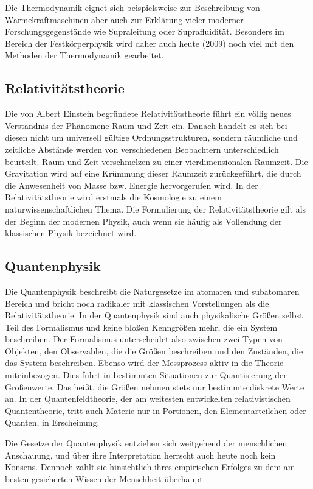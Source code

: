 \documentclass[titlepage, parkskip=full, twocolumn, landscape]{scrartcl}
\begin{document}
Die Thermodynamik eignet sich beispielsweise zur Beschreibung von Wärmekraftmaschinen aber auch zur Erklärung vieler moderner Forschungsgegenstände wie Supraleitung oder Suprafluidität. Besonders im Bereich der Festkörperphysik wird daher auch heute (2009) noch viel mit den Methoden der Thermodynamik gearbeitet.

\subsection{Relativitätstheorie}

Die von Albert Einstein begründete Relativitätstheorie führt ein völlig neues Verständnis der Phänomene Raum und Zeit ein. Danach handelt es sich bei diesen nicht um universell gültige Ordnungsstrukturen, sondern räumliche und zeitliche Abstände werden von verschiedenen Beobachtern unterschiedlich beurteilt. Raum und Zeit verschmelzen zu einer vierdimensionalen Raumzeit. Die Gravitation wird auf eine Krümmung dieser Raumzeit zurückgeführt, die durch die Anwesenheit von Masse bzw. Energie hervorgerufen wird. In der Relativitätstheorie wird erstmals die Kosmologie zu einem naturwissenschaftlichen Thema. Die Formulierung der Relativitätstheorie gilt als der Beginn der modernen Physik, auch wenn sie häufig als Vollendung der klassischen Physik bezeichnet wird.

\subsection{Quantenphysik}

Die Quantenphysik beschreibt die Naturgesetze im atomaren und subatomaren Bereich und bricht noch radikaler mit klassischen Vorstellungen als die Relativitätstheorie. In der Quantenphysik sind auch physikalische Größen selbst Teil des Formalismus und keine bloßen Kenngrößen mehr, die ein System beschreiben. Der Formalismus unterscheidet also zwischen zwei Typen von Objekten, den Observablen, die die Größen beschreiben und den Zuständen, die das System beschreiben. Ebenso wird der Messprozess aktiv in die Theorie miteinbezogen. Dies führt in bestimmten Situationen zur Quantisierung der Größenwerte. Das heißt, die Größen nehmen stets nur bestimmte diskrete Werte an. In der Quantenfeldtheorie, der am weitesten entwickelten relativistischen Quantentheorie, tritt auch Materie nur in Portionen, den Elementarteilchen oder Quanten, in Erscheinung.

Die Gesetze der Quantenphysik entziehen sich weitgehend der menschlichen Anschauung, und über ihre Interpretation herrscht auch heute noch kein Konsens. Dennoch zählt sie hinsichtlich ihres empirischen Erfolges zu dem am besten gesicherten Wissen der Menschheit überhaupt.
\end{document}
